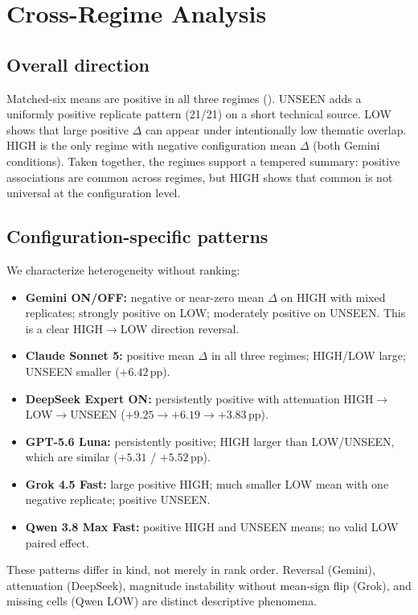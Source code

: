 \section{Cross-Regime Analysis}
\label{sec:cross}

\subsection{Overall direction}
Matched-six means are positive in all three regimes ().
UNSEEN adds a uniformly positive replicate pattern (21/21) on a short technical source.
LOW shows that large positive $\Delta$ can appear under intentionally low thematic overlap.
HIGH is the only regime with negative configuration mean $\Delta$ (both Gemini conditions).
Taken together, the regimes support a tempered summary: positive associations are common across regimes, but HIGH shows that common is not universal at the configuration level.

\subsection{Configuration-specific patterns}
We characterize heterogeneity without ranking:

\begin{itemize}[leftmargin=*]
  \item \textbf{Gemini ON/OFF:} negative or near-zero mean $\Delta$ on HIGH with mixed replicates; strongly positive on LOW; moderately positive on UNSEEN. This is a clear HIGH$\rightarrow$LOW direction reversal.
  \item \textbf{Claude Sonnet 5:} positive mean $\Delta$ in all three regimes; HIGH/LOW large; UNSEEN smaller ($+6.42$\,pp).
  \item \textbf{DeepSeek Expert ON:} persistently positive with attenuation HIGH$\rightarrow$LOW$\rightarrow$UNSEEN ($+9.25\rightarrow +6.19\rightarrow +3.83$\,pp).
  \item \textbf{GPT-5.6 Luna:} persistently positive; HIGH larger than LOW/UNSEEN, which are similar ($+5.31$ / $+5.52$\,pp).
  \item \textbf{Grok 4.5 Fast:} large positive HIGH; much smaller LOW mean with one negative replicate; positive UNSEEN.
  \item \textbf{Qwen 3.8 Max Fast:} positive HIGH and UNSEEN means; no valid LOW paired effect.
\end{itemize}

These patterns differ in kind, not merely in rank order.
Reversal (Gemini), attenuation (DeepSeek), magnitude instability without mean-sign flip (Grok), and missing cells (Qwen LOW) are distinct descriptive phenomena.

